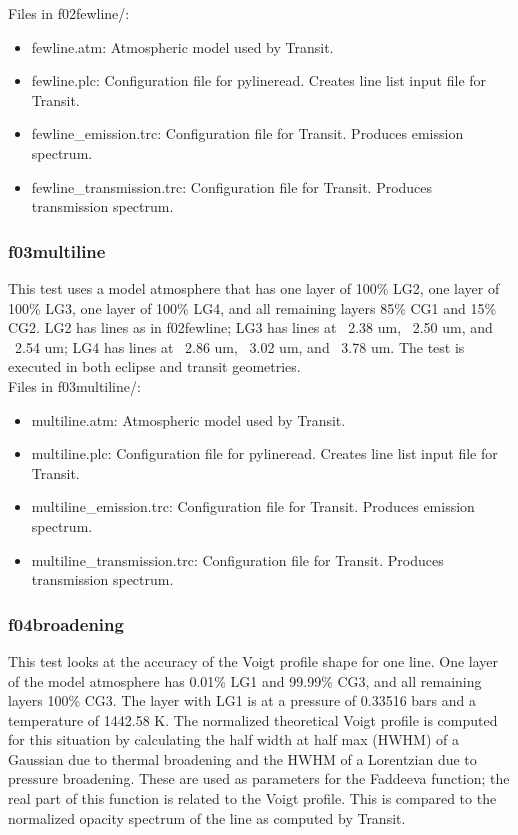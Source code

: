 \documentclass[letterpaper, 12pt]{article}
\begin{document}
Files in f02fewline/:
\begin{itemize} \itemsep0pt
  \item fewline.atm: Atmospheric model used by Transit.
  \item fewline.plc: Configuration file for pylineread. Creates line 
        list input file for Transit.
  \item fewline{\_}emission.trc: Configuration file for Transit. Produces 
        emission spectrum.
  \item fewline{\_}transmission.trc: Configuration file for Transit. Produces 
        transmission spectrum.
\end{itemize}

\subsubsection{f03multiline}
\label{sec:multiline}
This test uses a model atmosphere that has one layer of 100\% LG2, one layer 
of 100\% LG3, one layer of 100\% LG4, and all remaining layers 85\% CG1 and 
15\% CG2. LG2 has lines as in f02fewline; LG3 has lines at ~2.38 um, ~2.50 um, 
and ~2.54 um; LG4 has lines at ~2.86 um, ~3.02 um, and ~3.78 um. The test is 
executed in both eclipse and transit geometries.\\

Files in f03multiline/:
\begin{itemize} \itemsep0pt
  \item multiline.atm: Atmospheric model used by Transit.
  \item multiline.plc: Configuration file for pylineread. Creates line 
        list input file for Transit.
  \item multiline{\_}emission.trc: Configuration file for Transit. Produces 
        emission spectrum.
  \item multiline{\_}transmission.trc: Configuration file for Transit. Produces 
        transmission spectrum.
\end{itemize}

\subsubsection{f04broadening}
\label{sec:broadening}
This test looks at the accuracy of the Voigt profile shape for one line. 
One layer of the model atmosphere has 0.01\% LG1 and 99.99\% CG3, and 
all remaining layers 100\% CG3. The layer with LG1 is at a pressure of 
0.33516 bars and a temperature of 1442.58 K. The normalized theoretical Voigt 
profile is computed for this situation by calculating the half width at 
half max (HWHM) of a Gaussian due to thermal broadening and the HWHM of 
a Lorentzian due to pressure broadening. These are used as parameters for 
the Faddeeva function; the real part of this function is related to the 
Voigt profile. This is compared to the normalized opacity spectrum of the 
line as computed by Transit.\\
\end{document}
